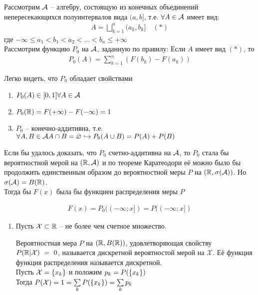 Рассмотрим $\mathcal{A}$ -- алгебру, состоящую из конечных объединений непересекающихся полуинтервалов вида $(a, b]$, т.е. $\forall A \in \mathcal{A}$ имеет вид:
\begin{align*}
	A = \bigsqcup_{k = 1}^{n} (a_k, b_k] \quad (*)
\end{align*}
где $-\infty \leq a_1 < b_1 < a_2 < \ldots < b_n \leq +\infty$\\

Рассмотрим функцию $P_0$ на $\mathcal{A}$, заданную по правилу: Если $A$ имеет вид $(*)$, то
\begin{align*}
	P_0 (A) = \sum_{k = 1}^{n} (F(b_k) - F(a_k))
\end{align*}

Легко видеть, что $P_0$ обладает свойствами 
\begin{enumerate}
	\item $P_0(A) \in [0, 1] \forall A \in \mathcal{A}$
	\item $P_0(\mathbb{R}) = F(+\infty) - F(-\infty) = 1$
	\item 
		$P_0$ -- конечно-аддитивна, т.е. 
		$\forall A, B \in \mathcal{A}\\
		 A \cap B = \varnothing \hookrightarrow P_0 (A \cup B) = P(A) + P(B)$
\end{enumerate}

Если бы удалось доказать, что $P_0$  счетно-аддитивна на $\mathcal{A}$, 
то $P_0$ стала бы вероятностной мерой на $(\mathbb{R}, \mathcal{A})$ и по теореме Каратеодори
 её можно было бы продолжить единственным образом до вероятностной меры $P$ 
 на $(\mathbb{R}, \sigma(\mathcal{A}))$. Но $\sigma(\mathcal{A}) = B(\mathbb{R})$.\\

Тогда бы $F(x)$ была бы функциеи распределения меры $P$

\begin{align*}
	F(x) = P_0 ((-\infty; x]) = P((-\infty; x])
\end{align*}


\begin{enumerate}[label=\protect\circled{\arabic*},series=distributions]
	\item 

		Пусть $\mathcal{X} \subset \mathbb{R}$ -- не более чем счетное множество.
		\begin{definition}
			Вероятностная мера $P$ на $(\mathbb{R}, B(\mathbb{R}))$, удовлетворяющая свойству 
			$P(\mathbb{R} | \mathcal{X})~=~0$, называется дискретной вероятностой мерой на $\mathcal{X}$. 
			Её функция функция распределения называется дискретной.\\
			Пусть $\mathcal{X} = \left\{ x_k \right\}$ и положим $p_k = P(\left\{ x_k \right\})$\\
			Тогда $P(\mathcal{X}) = 1 = \sum\limits_{k} P(\left\{ x_k \right\}) = \sum\limits_k p_k$
		\end{definition}
\end{enumerate}

